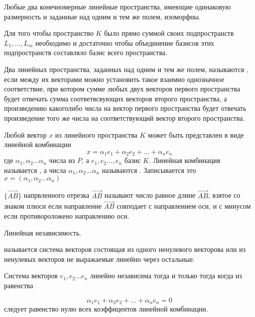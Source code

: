 \begin{theorem}
  Любые два конечномерные линейные пространства, имеющие одинаковую размерность
и заданные над одним и тем же полем, изоморфны.
\end{theorem}

\begin{theorem}
  Для того чтобы пространство $K$ было прямо суммой своих подпространств
$L_1, \ldots, L_m$ необходимо и достаточно чтобы объединение базисов этих
подпространств составляло базис всего пространства.
\end{theorem}

\begin{defin}[изоморфизма]
  Два линейных пространства, заданных над одним и тем же полем, называются
, если между их векторами можно установить такое взаимно
однозначное соответствие, при котором сумме любых двух векторов первого
пространства будет отвечать сумма соответвсвующих векторов второго пространства,
а произведению какоголибо числа на вектор первого пространства будет отвечать
произведение того же числа на соответствующий вектор второго пространства.
\end{defin}
  Любой вектор $x$ из линейного пространства $K$ может быть представлен в виде
линейной комбинации
\[
  x = \alpha_1 e_1 + \alpha_2 e_2 + \ldots + \alpha_n e_n
\]
где $\alpha_1, \alpha_2 \ldots \alpha_n$ числа из $P$, а $e_1, e_2 \ldots, e_n$
базис $K$. Линейная комбинация называется
, а числа
$\alpha_1, \alpha_2 \ldots \alpha_n$ называются
. Записывается это
$x = (\alpha_1, \alpha_2 \ldots \alpha_n)$

   $\{\overrightarrow{AB}\}$ напрвленного отрезка
$\overrightarrow{AB}$ называют число равное длине $\overrightarrow{AB}$, взятое
со знаком плюси если направление $\overrightarrow{AB}$ совподает с направлением
оси, и с минусом если противороложено направлению оси.

\begin{title}[\Large]
  Линейная независимость.
\end{title}

\begin{defin}
   называется система векторов состоящая из одного
ненулевого векторова или из ненулевых векторов не выражаемые линейно через
остальные.
\end{defin}

\begin{theorem}
  Система векторов $e_1, e_2 \ldots e_n$ линейно независима тогда
и только тогда когда из равенства

\[
  \alpha_1 e_1 + \alpha_2 e_2 + \ldots + \alpha_n e_n = 0
\]
следует равенство нулю всех коэффицентов линейной комбинации.
\end{theorem}


